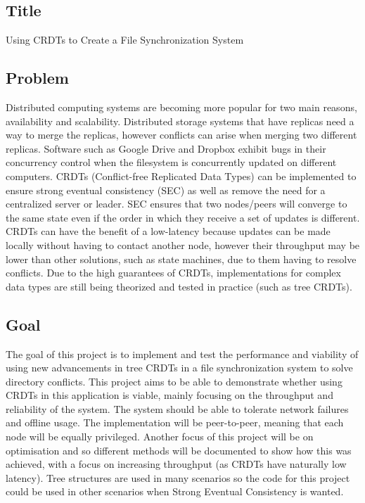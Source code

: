 \documentclass[12pt]{article}
\begin{document}
\subsection{Title}
\begin{center}
Using CRDTs to Create a File Synchronization System
\end{center}

\subsection{Problem}
Distributed computing systems are becoming more popular for two main reasons, availability
and scalability. Distributed storage systems that have replicas need a way to merge the replicas,
however conflicts can arise when merging two different replicas. Software such as Google Drive
and Dropbox exhibit bugs in their concurrency control when the filesystem is concurrently
updated on different computers. CRDTs (Conflict-free Replicated Data Types) can be
implemented to ensure strong eventual consistency (SEC) as well as remove the need for a
centralized server or leader. SEC ensures that two nodes/peers will converge to the same state
even if the order in which they receive a set of updates is different. CRDTs can have the benefit
of a low-latency because updates can be made locally without having to contact another node,
however their throughput may be lower than other solutions, such as state machines, due to
them having to resolve conflicts. Due to the high guarantees of CRDTs, implementations for
complex data types are still being theorized and tested in practice (such as tree CRDTs).

\subsection{Goal}
The goal of this project is to implement and test the performance and viability of using new
advancements in tree CRDTs in a file synchronization system to solve directory conflicts. This
project aims to be able to demonstrate whether using CRDTs in this application is viable, mainly
focusing on the throughput and reliability of the system. The system should be able to tolerate
network failures and offline usage. The implementation will be peer-to-peer, meaning that each
node will be equally privileged. Another focus of this project will be on optimisation and so
different methods will be documented to show how this was achieved, with a focus on
increasing throughput (as CRDTs have naturally low latency).
Tree structures are used in many scenarios so the code for this project could be used in other
scenarios when Strong Eventual Consistency is wanted.
\end{document}
